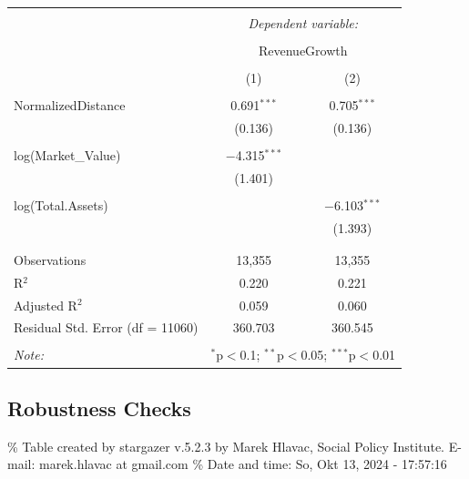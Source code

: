 \documentclass[
]{article}
\begin{document}
\begin{table}[!htbp] \centering 
  \caption{} 
  \label{} 
\begin{tabular}{@{\extracolsep{5pt}}lcc} 
\\[-1.8ex]\hline 
\hline \\[-1.8ex] 
 & \multicolumn{2}{c}{\textit{Dependent variable:}} \\ 
\cline{2-3} 
\\[-1.8ex] & \multicolumn{2}{c}{RevenueGrowth} \\ 
\\[-1.8ex] & (1) & (2)\\ 
\hline \\[-1.8ex] 
 NormalizedDistance & 0.691$^{***}$ & 0.705$^{***}$ \\ 
  & (0.136) & (0.136) \\ 
  & & \\ 
 log(Market\_Value) & $-$4.315$^{***}$ &  \\ 
  & (1.401) &  \\ 
  & & \\ 
 log(Total.Assets) &  & $-$6.103$^{***}$ \\ 
  &  & (1.393) \\ 
  & & \\ 
\hline \\[-1.8ex] 
Observations & 13,355 & 13,355 \\ 
R$^{2}$ & 0.220 & 0.221 \\ 
Adjusted R$^{2}$ & 0.059 & 0.060 \\ 
Residual Std. Error (df = 11060) & 360.703 & 360.545 \\ 
\hline 
\hline \\[-1.8ex] 
\textit{Note:}  & \multicolumn{2}{r}{$^{*}$p$<$0.1; $^{**}$p$<$0.05; $^{***}$p$<$0.01} \\ 
\end{tabular} 
\end{table}

\subsection{Robustness Checks}\label{robustness-checks}

\% Table created by stargazer v.5.2.3 by Marek Hlavac, Social Policy
Institute. E-mail: marek.hlavac at gmail.com \% Date and time: So, Okt
13, 2024 - 17:57:16
\end{document}
